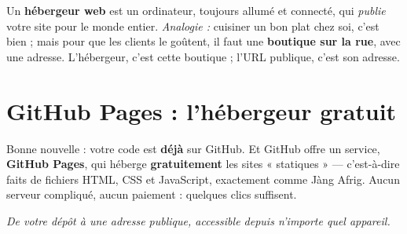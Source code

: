 \documentclass[11pt,a4paper]{article}
\newcommand{\code}[1]{\texttt{#1}}
\begin{document}
Un \textbf{hébergeur web} est un ordinateur, toujours allumé et connecté, qui \emph{publie} votre site pour le monde entier. \emph{Analogie :} cuisiner un bon plat chez soi, c'est bien ; mais pour que les clients le goûtent, il faut une \textbf{boutique sur la rue}, avec une adresse. L'hébergeur, c'est cette boutique ; l'URL publique, c'est son adresse.

\section{GitHub Pages : l'hébergeur gratuit}

Bonne nouvelle : votre code est \textbf{déjà} sur GitHub. Et GitHub offre un service, \textbf{GitHub Pages}, qui héberge \textbf{gratuitement} les sites « statiques » --- c'est-à-dire faits de fichiers HTML, CSS et JavaScript, exactement comme Jàng Afrig. Aucun serveur compliqué, aucun paiement : quelques clics suffisent.

\begin{center}

\textit{De votre dépôt à une adresse publique, accessible depuis n'importe quel appareil.}
\end{center}
\end{document}
